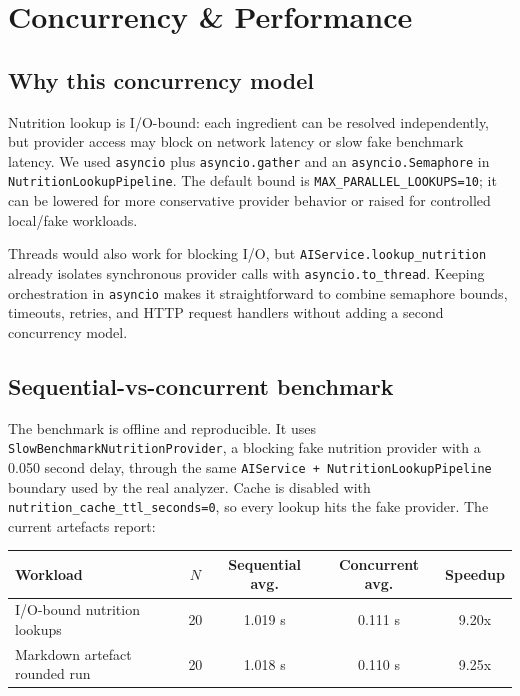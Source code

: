 \documentclass[11pt,a4paper]{article}
\begin{document}
\section{Concurrency \& Performance}\label{sec:concurrency}

\subsection{Why this concurrency model}
Nutrition lookup is I/O-bound: each ingredient can be resolved independently, but provider access may block on network latency or slow fake benchmark latency. We used \texttt{asyncio} plus \texttt{asyncio.gather} and an \texttt{asyncio.Semaphore} in \texttt{NutritionLookupPipeline}. The default bound is \texttt{MAX\_PARALLEL\_LOOKUPS=10}; it can be lowered for more conservative provider behavior or raised for controlled local/fake workloads.

Threads would also work for blocking I/O, but \texttt{AIService.lookup\_nutrition} already isolates synchronous provider calls with \texttt{asyncio.to\_thread}. Keeping orchestration in \texttt{asyncio} makes it straightforward to combine semaphore bounds, timeouts, retries, and HTTP request handlers without adding a second concurrency model.

\subsection{Sequential-vs-concurrent benchmark}
The benchmark is offline and reproducible. It uses \texttt{SlowBenchmarkNutritionProvider}, a blocking fake nutrition provider with a 0.050 second delay, through the same \texttt{AIService + NutritionLookupPipeline} boundary used by the real analyzer. Cache is disabled with \texttt{nutrition\_cache\_ttl\_seconds=0}, so every lookup hits the fake provider. The current artefacts report:

\begin{center}\small
\begin{tabular}{lcccc}
\toprule
\textbf{Workload} & $N$ & \textbf{Sequential avg.} & \textbf{Concurrent avg.} & \textbf{Speedup} \\
\midrule
I/O-bound nutrition lookups & 20 & 1.019 s & 0.111 s & 9.20x \\
Markdown artefact rounded run & 20 & 1.018 s & 0.110 s & 9.25x \\
\bottomrule
\end{tabular}
\end{center}
\end{document}
